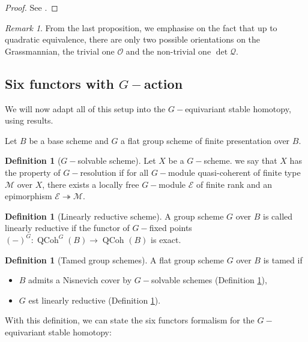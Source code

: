 \documentclass{amsart}
\theoremstyle{plain}%
\theoremstyle{remark}
\newtheorem{rmq}[subsubsection]{Remark}
\theoremstyle{definition}
\newtheorem{deff}[subsubsection]{Definition}
\newcommand{\cE}{\mathcal{E}}
\newcommand{\cM}{\mathscr{M}}
\newcommand{\cO}{\mathcal{O}}
\newcommand{\cQ}{\mathcal{Q}}
\newcommand{\QCoh}[2][]{\operatorname{QCoh}^{#1}\left(#2\right)}
\begin{document}
\begin{proof}See \cite[Proposition 2.4.7]{Cha_dP2-4}.

\end{proof}
 


\begin{rmq}
From the last proposition, we emphasise on the fact that up to quadratic equivalence, there are only two possible orientations on the Grassmannian, the trivial one $\cO$ and the non-trivial one $\det \cQ.$
\end{rmq}


\subsection{Six functors with $G-$action}
We will now adapt all of this setup into the $G-$equivariant stable homotopy, using \cite{Hoyois_G-equiv} results.

Let $B$ be a base scheme and $G$ a flat group scheme of finite presentation over $B$.

\begin{deff}[$G-$solvable scheme]\label{DEF - schema G resoluble}
Let $X$ be a $G-$scheme. we say that $X$ has the property of $G-$resolution if for all $G-$module quasi-coherent of finite type $\cM$ over $X$, there exists a locally free $G-$module $\cE$ of finite rank and an epimorphism $\cE \twoheadrightarrow\cM$.
\end{deff}

\begin{deff}[Linearly reductive scheme]\label{DEF - schema lin reductif}
A group scheme $G$ over $B$ is called linearly reductive if the functor of $G-$fixed points $(-)^G : \QCoh[G]{B} \to \QCoh{B}$ is exact.
\end{deff}

\begin{deff}[Tamed group schemes]\label{DEF - schema en grp modere}
A flat group scheme $G$ over $B$ is tamed if
\begin{itemize}
\item $B$ admits a Nisnevich cover by $G-$solvable schemes (Definition \ref{DEF - schema G resoluble}),
\item $G$ est linearly reductive (Definition \ref{DEF - schema lin reductif}).
\end{itemize}
\end{deff}

With this definition, we can state the six functors formalism for the $G-$equivariant stable homotopy:
\end{document}
